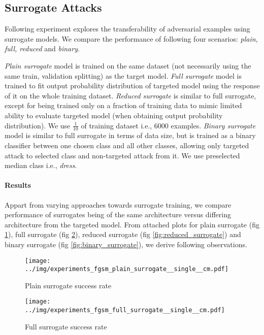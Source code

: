 \subsection{Surrogate Attacks}
\label{sec:surrogate_fgsm}
Following experiment explores the transferability of adversarial examples using surrogate models. We compare the performance of following four scenarios: \emph{plain, full, reduced} and \emph{binary}.

\emph{Plain surrogate} model is trained on the same dataset (not necessarily using the same train, validation splitting) as the target model. \emph{Full surrogate} model is trained to fit output probability distribution of targeted model using the response of it on the whole training dataset. \emph{Reduced surrogate} is similar to full surrogate, except for being trained only on a fraction of training data to mimic limited ability to evaluate targeted model (when obtaining output probability distribution). We use $\frac{1}{10}$ of training dataset i.e., 6000 examples. \emph{Binary surrogate} model is similar to full surrogate in terms of data size, but is trained as a binary classifier between one chosen class and all other classes, allowing only targeted attack to selected class and non-targeted attack from it. We use preselected median class i.e., \emph{dress}.

\paragraph{Results}
Appart from varying approaches towards surrogate training, we compare performance of surrogates being of the same architecture versus differing architecture from the targeted model. From attached plots for plain surrogate (fig \ref{fig:plain_surrogate}), full surrogate (fig \ref{fig:full_surrogate}), reduced surrogate (fig \ref{fig:reduced_surrogate}) and binary surrogate (fig \ref{fig:binary_surrogate}), we derive following observations.

\begin{figure}
    \centering
    \texttt{[image: ../img/experiments\_fgsm\_plain\_surrogate\_\_single\_\_cm.pdf]}
    \caption{Plain surrogate success rate}
    \label{fig:plain_surrogate}
\end{figure}

\begin{figure}
    \centering
    \texttt{[image: ../img/experiments\_fgsm\_full\_surrogate\_\_single\_\_cm.pdf]}
    \caption{Full surrogate success rate}
    \label{fig:full_surrogate}
\end{figure}

